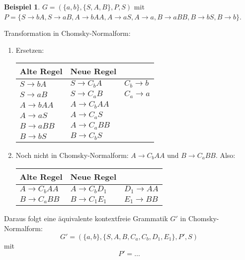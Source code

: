 \documentclass[11pt]{article} %
\theoremstyle{definition}
\newtheorem*{beispiel}{Beispiel}
\begin{document}
\begin{beispiel}
$G = (\{a,b\}, \{S,A,B\}, P, S)$ mit $P = \{S\rightarrow bA, S\rightarrow aB, A\rightarrow bAA, A \rightarrow aS, A \rightarrow a, B \rightarrow aBB, B \rightarrow bS, B \rightarrow b\}$.

Transformation in Chomsky-Normalform:
\begin{enumerate}
\item Ersetzen:
\begin{center}
\begin{tabular}{lll}
\toprule
Alte Regel & Neue Regel \\
\midrule
$S \rightarrow bA$ & $S \rightarrow C_bA$ &$ C_b\rightarrow b$ \\
$S \rightarrow aB$ & $S \rightarrow C_aB$ &$ C_a\rightarrow a$ \\
$A\rightarrow bAA$ & $A\rightarrow C_bAA$ \\
$A\rightarrow aS$ & $A\rightarrow C_aS$ \\
$B\rightarrow aBB$ & $A\rightarrow C_aBB$ \\
$B \rightarrow bS$ & $B \rightarrow C_bS$ \\
\bottomrule
\end{tabular}%

\end{center}

\item Noch nicht in Chomsky-Normalform: $A\rightarrow C_bAA$ und $B \rightarrow C_aBB$. Also:
\begin{center}
\begin{tabular}{lll}
\toprule
Alte Regel & Neue Regel &  \\
\midrule
$A\rightarrow C_bAA$ & $A \rightarrow C_bD_1$ & $D_1 \rightarrow AA$ \\
$B \rightarrow C_aBB$ & $B \rightarrow C_1E_1$ & $E_1 \rightarrow BB$ \\
\bottomrule
\end{tabular}%

\end{center}

\end{enumerate}

Daraus folgt eine äquivalente kontextfreie Grammatik $G'$ in Chomsky-Normalform:
\[
G' = (\{a, b\}, \{S,A,B,C_a, C_b, D_1, E_1\}, P', S)
\]
mit
\[
P' = \dots
\]

\end{beispiel}
\end{document}
